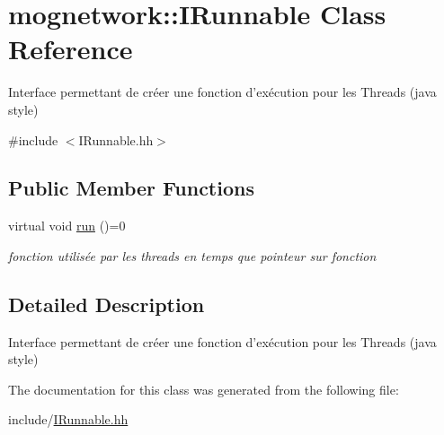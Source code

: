 \hypertarget{classmognetwork_1_1_i_runnable}{\section{mognetwork\-:\-:I\-Runnable Class Reference}
\label{classmognetwork_1_1_i_runnable}
}


Interface permettant de créer une fonction d'exécution pour les Threads (java style)  




{\ttfamily \#include $<$I\-Runnable.\-hh$>$}

\subsection*{Public Member Functions}
\begin{DoxyCompactItemize}
\item 
\hypertarget{classmognetwork_1_1_i_runnable_ac53515c8ecf2b2c79cb9c161fdd600d1}{virtual void \hyperlink{classmognetwork_1_1_i_runnable_ac53515c8ecf2b2c79cb9c161fdd600d1}{run} ()=0}\label{classmognetwork_1_1_i_runnable_ac53515c8ecf2b2c79cb9c161fdd600d1}

\begin{DoxyCompactList}\small\item\em fonction utilisée par les threads en temps que pointeur sur fonction \end{DoxyCompactList}\end{DoxyCompactItemize}


\subsection{Detailed Description}
Interface permettant de créer une fonction d'exécution pour les Threads (java style) 

The documentation for this class was generated from the following file\-:\begin{DoxyCompactItemize}
\item 
include/\hyperlink{_i_runnable_8hh}{I\-Runnable.\-hh}\end{DoxyCompactItemize}
